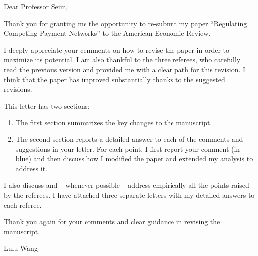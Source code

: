\documentclass[main.tex]{subfiles}
\begin{document}
\setcounter{footnote}{0}
\renewcommand{\thepage}{E-\arabic{page}}
    
Dear Professor Seim,

Thank you for granting me the opportunity to re-submit my paper “Regulating Competing Payment Networks” to the American Economic Review.

I deeply appreciate your comments on how to revise the paper in order to maximize its potential.
I am also thankful to the three referees, who carefully read the previous version and provided me with a clear path for this revision.
I think that the paper has improved substantially thanks to the suggested revisions.

This letter has two sections:
\begin{enumerate}
    \item The first section summarizes the key changes to the manuscript.
    \item The second section reports a detailed answer to each of the comments and suggestions in your letter.
For each point, I first report your comment (in blue) and then discuss how I modified the paper and extended my analysis to address it.
\end{enumerate}

I also discuss and -- whenever possible -- address empirically all the points raised by the referees.
I have attached three separate letters with my detailed answers to each referee.

Thank you again for your comments and clear guidance in revising the manuscript.

Lulu Wang

\newpage{}


\newpage{}
\end{document}
